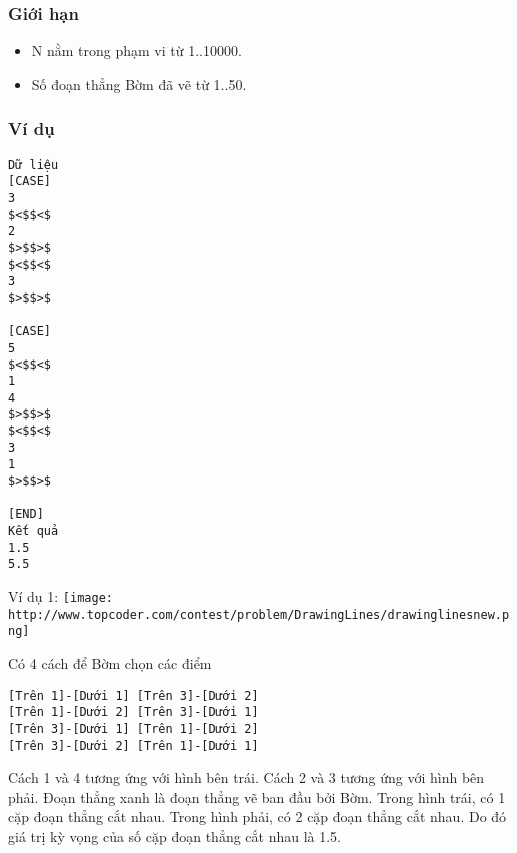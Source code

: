 \subsubsection{   Giới hạn  }
\begin{itemize}
	\item     N nằm trong phạm vi từ 1..10000.   
	\item     Số đoạn thẳng Bờm đã vẽ từ 1..50.   
\end{itemize}

\subsubsection{   Ví dụ  }
\begin{verbatim}
Dữ liệu
[CASE]
3
$<$$<$
2
$>$$>$
$<$$<$
3
$>$$>$

[CASE]
5
$<$$<$
1
4
$>$$>$
$<$$<$
3
1
$>$$>$

[END]
Kết quả
1.5
5.5
\end{verbatim}

   Ví dụ 1:  
\texttt{[image: http://www.topcoder.com/contest/problem/DrawingLines/drawinglinesnew.png]}

   Có 4 cách để Bờm chọn các điểm  
\begin{verbatim}
[Trên 1]-[Dưới 1] [Trên 3]-[Dưới 2]
[Trên 1]-[Dưới 2] [Trên 3]-[Dưới 1]
[Trên 3]-[Dưới 1] [Trên 1]-[Dưới 2]
[Trên 3]-[Dưới 2] [Trên 1]-[Dưới 1]
\end{verbatim}

   Cách 1 và 4 tương ứng với hình bên trái. Cách 2 và 3 tương ứng với hình bên phải. Đoạn thẳng xanh là đoạn thẳng vẽ ban đầu bởi Bờm. Trong hình trái, có 1 cặp đoạn thẳng cắt nhau. Trong hình phải, có 2 cặp đoạn thẳng cắt nhau. Do đó giá trị kỳ vọng của số cặp đoạn thẳng cắt nhau là 1.5.  